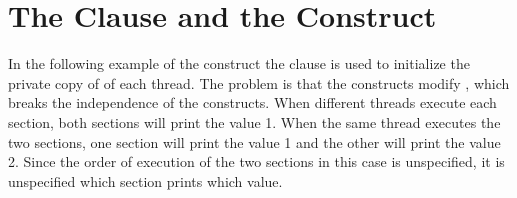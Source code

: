 \pagebreak
\section{The  Clause and the  Construct}
\label{sec:fpriv_sections}

In the following example of the  construct  the  
clause is used to initialize the private copy of  of each 
thread. The problem is that the  constructs modify , 
which breaks the independence of the  constructs. When different 
threads execute each section, both sections will print the value 1. When the same 
thread executes the two sections, one section will print the value 1 and the other 
will print the value 2. Since the order of execution of the two sections in this 
case is unspecified, it is unspecified which section prints which value. 




